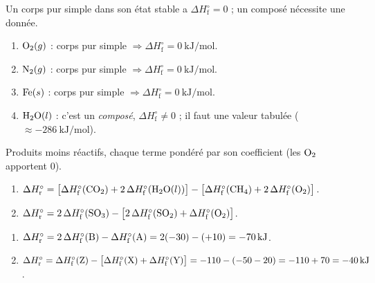 \documentclass[11pt,a4paper]{article}
\begin{document}
\begin{corrige}
Un corps pur simple dans son état stable a $\Delta H^\circ_{\text{f}}=0$ ; un composé nécessite une donnée.
\begin{enumerate}[label=\alph*)]
  \item $\ce{O2}(g)$ : corps pur simple $\Rightarrow \Delta H^\circ_{\text{f}}=\qty{0}{\kilo\joule\per\mol}$.
  \item $\ce{N2}(g)$ : corps pur simple $\Rightarrow \Delta H^\circ_{\text{f}}=\qty{0}{\kilo\joule\per\mol}$.
  \item $\ce{Fe}(s)$ : corps pur simple $\Rightarrow \Delta H^\circ_{\text{f}}=\qty{0}{\kilo\joule\per\mol}$.
  \item $\ce{H2O}(l)$ : c'est un \emph{composé}, $\Delta H^\circ_{\text{f}}\ne 0$ ; il faut une valeur tabulée (\;$\approx\qty{-286}{\kilo\joule\per\mol}$\;).
\end{enumerate}
\end{corrige}

\begin{corrige}
Produits moins réactifs, chaque terme pondéré par son coefficient (les $\ce{O2}$ apportent $0$).
\begin{enumerate}[label=\alph*)]
  \item $\Delta H^\circ_{\text{r}} = \big[\Delta H^\circ_{\text{f}}(\ce{CO2}) + 2\,\Delta H^\circ_{\text{f}}(\ce{H2O}(l))\big] - \big[\Delta H^\circ_{\text{f}}(\ce{CH4}) + 2\,\Delta H^\circ_{\text{f}}(\ce{O2})\big]$.
  \item $\Delta H^\circ_{\text{r}} = 2\,\Delta H^\circ_{\text{f}}(\ce{SO3}) - \big[2\,\Delta H^\circ_{\text{f}}(\ce{SO2}) + \Delta H^\circ_{\text{f}}(\ce{O2})\big]$.
\end{enumerate}
\end{corrige}

\begin{corrige}
\begin{enumerate}[label=\alph*)]
  \item $\Delta H^\circ_{\text{r}} = 2\,\Delta H^\circ_{\text{f}}(\ce{B}) - \Delta H^\circ_{\text{f}}(\ce{A}) = 2(-30) - (+10) = \qty{-70}{\kilo\joule}$.
  \item $\Delta H^\circ_{\text{r}} = \Delta H^\circ_{\text{f}}(\ce{Z}) - \big[\Delta H^\circ_{\text{f}}(\ce{X}) + \Delta H^\circ_{\text{f}}(\ce{Y})\big] = -110 - (-50 - 20) = -110 + 70 = \qty{-40}{\kilo\joule}$.
\end{enumerate}
\end{corrige}
\end{document}
